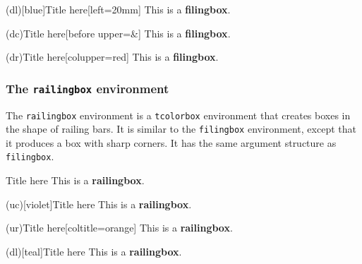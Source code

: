 \begin{verbbox}
\begin{filingbox}(dl)[blue]{Title here}[left=20mm]
This is a \textbf{filingbox}.
\end{filingbox}
\end{verbbox}

\begin{verbbox}
\begin{filingbox}(dc){Title here}[before upper=\&]
This is a \textbf{filingbox}.
\end{filingbox}
\end{verbbox}

\begin{verbbox}
\begin{filingbox}(dr){Title here}[colupper=red]
This is a \textbf{filingbox}.
\end{filingbox}
\end{verbbox}

\subsubsection*{The \texttt{railingbox} environment}

The \texttt{railingbox} environment is a \texttt{tcolorbox} environment that creates boxes in the shape of railing bars. It is similar to the \texttt{filingbox} environment, except that it produces a box with sharp corners. It has the same argument structure as \texttt{filingbox}.

\begin{verbbox}
\begin{railingbox}{Title here}
This is a \textbf{railingbox}.
\end{railingbox}
\end{verbbox}

\begin{verbbox}
\begin{railingbox}(uc)[violet]{Title here}
This is a \textbf{railingbox}.
\end{railingbox}
\end{verbbox}

\begin{verbbox}
\begin{railingbox}(ur){Title here}[coltitle=orange]
This is a \textbf{railingbox}.
\end{railingbox}
\end{verbbox}

\begin{verbbox}
\begin{railingbox}(dl)[teal]{Title here}
This is a \textbf{railingbox}.
\end{railingbox}
\end{verbbox}

